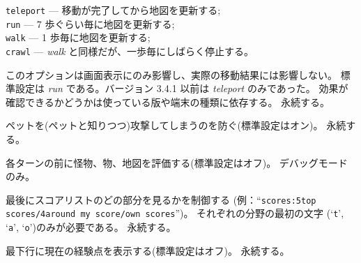{\tt teleport} --- 移動が完了してから地図を更新する;\\
{\tt run} --- 7 歩ぐらい毎に地図を更新する;\\
{\tt walk} --- 1 歩毎に地図を更新する;\\
{\tt crawl} --- {\it walk\/} と同様だが、一歩毎にしばらく停止する。

このオプションは画面表示にのみ影響し、実際の移動結果には影響しない。
標準設定は {\it run\/} である。バージョン 3.4.1 以前は {\it teleport\/} のみであった。
効果が確認できるかどうかは使っている版や端末の種類に依存する。
永続する。
\item[\ib{safe\verb+_+pet}]
ペットを(ペットと知りつつ)攻撃してしまうのを防ぐ(標準設定はオン)。
永続する。
\item[\ib{sanity\verb+_+check}]
各ターンの前に怪物、物、地図を評価する(標準設定はオフ)。
デバッグモードのみ。
\item[\ib{scores}]
最後にスコアリストのどの部分を見るかを制御する
(例：``{\tt scores:5top scores/4around my score/own scores}'')。
それぞれの分野の最初の文字 (`{\tt t}', `{\tt a}', `{\tt o}')のみが必要である。
永続する。
\item[\ib{showexp}]
最下行に現在の経験点を表示する(標準設定はオフ)。
永続する。
\item[\ib{showrace}]

